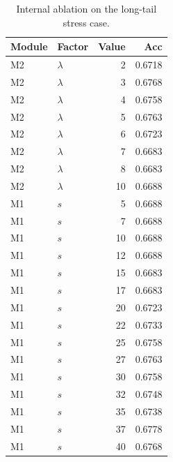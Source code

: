 \begin{table}[t]
\centering
\caption{Internal ablation on the long-tail stress case.}
\label{tab:internal-ablation}
\scriptsize
\setlength{\tabcolsep}{3.2pt}
\begin{tabular}{llrr}
\toprule
Module & Factor & Value & Acc \\
\midrule
M2 & $\lambda$ & 2 & 0.6718 \\
M2 & $\lambda$ & 3 & 0.6768 \\
M2 & $\lambda$ & 4 & 0.6758 \\
M2 & $\lambda$ & 5 & 0.6763 \\
M2 & $\lambda$ & 6 & 0.6723 \\
M2 & $\lambda$ & 7 & 0.6683 \\
M2 & $\lambda$ & 8 & 0.6683 \\
M2 & $\lambda$ & 10 & 0.6688 \\
M1 & $s$ & 5 & 0.6688 \\
M1 & $s$ & 7 & 0.6688 \\
M1 & $s$ & 10 & 0.6688 \\
M1 & $s$ & 12 & 0.6688 \\
M1 & $s$ & 15 & 0.6683 \\
M1 & $s$ & 17 & 0.6683 \\
M1 & $s$ & 20 & 0.6723 \\
M1 & $s$ & 22 & 0.6733 \\
M1 & $s$ & 25 & 0.6758 \\
M1 & $s$ & 27 & 0.6763 \\
M1 & $s$ & 30 & 0.6758 \\
M1 & $s$ & 32 & 0.6748 \\
M1 & $s$ & 35 & 0.6738 \\
M1 & $s$ & 37 & 0.6778 \\
M1 & $s$ & 40 & 0.6768 \\
\bottomrule
\end{tabular}
\end{table}

